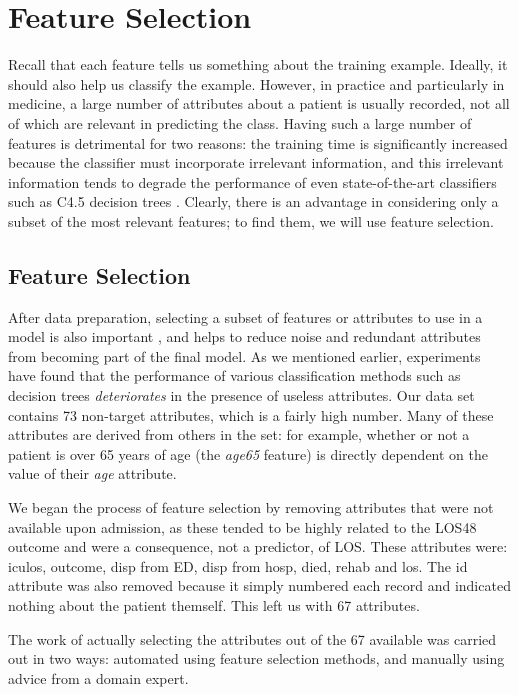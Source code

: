 \chapter{Feature Selection} \label{chap:selection}

Recall that each feature tells
us something about the training example. Ideally, it should also help us
classify the example. However, in practice and particularly
in medicine, a large number of attributes about a patient is usually recorded,
not all of which are relevant in predicting the class.
Having such a large number of features
is detrimental for two reasons: the training time is significantly
increased because the classifier must incorporate irrelevant information, and
this irrelevant information tends to degrade the performance
of even state-of-the-art classifiers such as C4.5 decision trees
\cite{Witten2005}. Clearly, there is an advantage in considering only a subset
of the most relevant features; to find them, we will use feature selection.

\section{Feature Selection}
After data preparation, selecting a subset of features or attributes to use
in a model is also important \citep{Kotsiantis2006},
and helps to reduce noise and redundant
attributes from becoming part of the final model. As we mentioned earlier,
experiments have found that
the performance of various classification methods such as decision trees
\textit{deteriorates} in the presence of useless attributes.
Our data set contains 73
non-target attributes, which is a fairly high number. Many of these attributes
are derived from others in the set: for example, whether or not a patient is
over 65 years of age (the \textit{age65} feature) is directly dependent on the
value of their \textit{age} attribute.

We began the process of feature selection by removing attributes that were
not available upon admission, as these tended to be highly related to the
LOS48 outcome and were a consequence, not a predictor, of LOS. These attributes
were: iculos, outcome, disp from ED, disp from hosp, died, rehab and los.
The id attribute was also removed because it simply numbered each record and
indicated nothing about the patient themself. This left us with 67 attributes.

The work of actually selecting the attributes out of the 67 available was
carried out in two ways: automated using feature selection methods, and
manually using advice from a domain expert.

